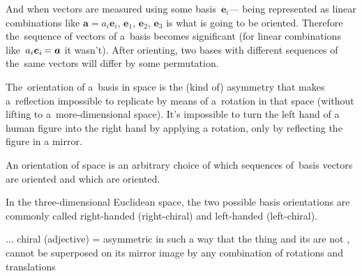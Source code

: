 \vspace{.2em}
And when vectors are measured using some basis~$\bm{e}_i$\:--- being represented as linear combinations like ${\bm{a} = a_i \bm{e}_i}$,   $\bm{e}_1$, $\bm{e}_2$, $\bm{e}_3$ is what is going to be oriented.
Therefore the~sequence of vectors of a~basis becomes significant (for linear combinations like~${a_i \bm{e}_i \hspace{-0.2ex} = \bm{a}}$ it wasn’t).
After orienting, two bases with different sequences of the~same vectors will differ by some permutation.

{\small%
The~orientation of a~basis in space is the (kind of) asymmetry that makes a~reflection impossible to replicate by means of a~rotation in that space (without lifting to a~more\hbox{-}dimensional space).
It’s impossible to turn the left hand of a human figure into the right hand by applying a rotation, only by reflecting the figure in a mirror.

An orientation of space is an arbitrary choice of which sequences of~basis vectors are  oriented and which are  oriented.

In the three-dimensional Euclidean space, the two possible basis orientations are commonly called right-handed (right-chiral) and left-handed (left-chiral).




... chiral (adjective) = asymmetric in such a way that the thing and its  are not , cannot be superposed on its mirror image by any combination of rotations and translations
\par}

